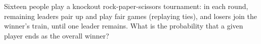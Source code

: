 Sixteen people play a knockout rock-paper-scissors tournament: in each round, remaining leaders pair up and play fair games (replaying ties), and losers join the winner's train, until one leader remains. What is the probability that a given player ends as the overall winner?

